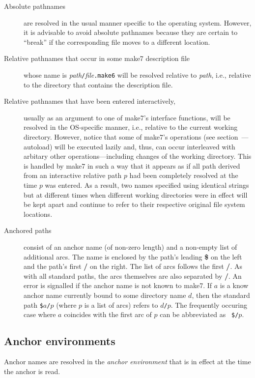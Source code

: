 \begin{description}
\item[Absolute pathnames] are resolved in the usual manner
specific to the operating system.  However, it is advisable to avoid
absolute pathnames because they are certain to ``break'' if the
corresponding file moves to a different location.
\item[Relative pathnames that occur in some make7 description file] whose
name is {\it path}{\tt /}{\it file}{\tt .make6} will be resolved relative
to {\it path}, i.e., relative to the directory that contains the
description file.
\item[Relative pathnames that have been entered interactively,]
usually as an argument to one of make7's interface functions, will be
resolved in the OS-specific manner, i.e., relative to the current
working directory.  However, notice that some of make7's operations (see
section~---autoload) will be executed lazily and,
thus, can occur interleaved with arbitary other operations---including
changes of the working directory.  This is handled by make7 in such a way
that it appears as if all path derived from an interactive relative
path $p$ had been completely resolved at the time $p$ was entered. As
a result, two names specified using identical strings but at different
times when different working directories were in effect will be kept
apart and continue to refer to their respective original file system
locations.
\item[Anchored paths] consist of an anchor name (of non-zero length)
and a non-empty list of additional arcs.  The name is enclosed by
the path's leading {\bf \$} on the left and the path's first {\bf /}
on the right.  The list of arcs follows the first {\bf /}.  As with
all standard paths, the arcs themselves are also separated by {\bf /}.
An error is signalled if the anchor name is not known to make7.
If $a$ is a know anchor name currently bound to some directory name
$d$, then the standard path {\tt \$}$a${\tt /}$p$ (where $p$ is a list
of arcs) refers to $d${\tt /}$p$.  The frequently occuring case where
$a$ coincides with the first arc of $p$ can be abbreviated as {\tt
\$/}$p$.
\end{description}

\subsection{Anchor environments}
\label{sec:anchor:env}

Anchor names are resolved in the {\em anchor environment} that is in
effect at the time the anchor is read.

